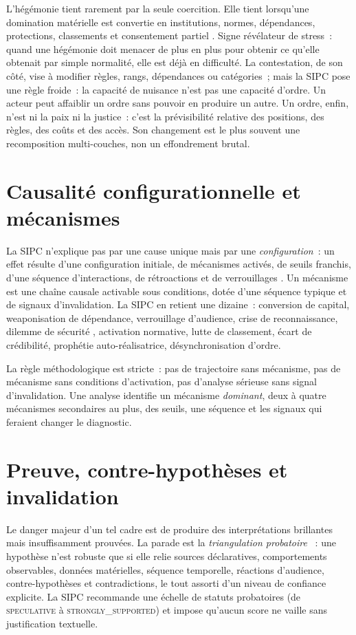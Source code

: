 \documentclass[11pt,a4paper]{article}
\begin{document}
L'hégémonie tient rarement par la seule coercition. Elle tient lorsqu'une domination matérielle
est convertie en institutions, normes, dépendances, protections, classements et consentement
partiel \autocite{gramsci1971,gilpin1987}. Signe révélateur de stress~: quand une hégémonie doit
menacer de plus en plus pour obtenir ce qu'elle obtenait par simple normalité, elle est déjà en
difficulté. La contestation, de son côté, vise à modifier règles, rangs, dépendances ou
catégories~; mais la SIPC pose une règle froide~: la capacité de nuisance n'est pas une capacité
d'ordre. Un acteur peut affaiblir un ordre sans pouvoir en produire un autre. Un ordre, enfin,
n'est ni la paix ni la justice~: c'est la prévisibilité relative des positions, des règles, des
coûts et des accès. Son changement est le plus souvent une recomposition multi-couches, non un
effondrement brutal.

\section{Causalité configurationnelle et mécanismes}
\label{sec:causalite}

La SIPC n'explique pas par une cause unique mais par une \emph{configuration}~: un effet résulte
d'une configuration initiale, de mécanismes activés, de seuils franchis, d'une séquence
d'interactions, de rétroactions et de verrouillages \autocite{hedstromSwedberg1998,elster1989}.
Un mécanisme est une chaîne causale activable sous conditions, dotée d'une séquence typique et
de signaux d'invalidation. La SIPC en retient une dizaine~: conversion de capital, weaponisation
de dépendance, verrouillage d'audience, crise de reconnaissance, dilemme de sécurité
\autocite{jervis1976}, activation normative, lutte de classement, écart de crédibilité,
prophétie auto-réalisatrice, désynchronisation d'ordre.

La règle méthodologique est stricte~: pas de trajectoire sans mécanisme, pas de mécanisme sans
conditions d'activation, pas d'analyse sérieuse sans signal d'invalidation. Une analyse
identifie un mécanisme \emph{dominant}, deux à quatre mécanismes secondaires au plus, des seuils,
une séquence et les signaux qui feraient changer le diagnostic.

\section{Preuve, contre-hypothèses et invalidation}
\label{sec:preuve}

Le danger majeur d'un tel cadre est de produire des interprétations brillantes mais
insuffisamment prouvées. La parade est la \emph{triangulation probatoire}
\autocite{beachPedersen2013}~: une hypothèse n'est robuste que si elle relie sources
déclaratives, comportements observables, données matérielles, séquence temporelle, réactions
d'audience, contre-hypothèses et contradictions, le tout assorti d'un niveau de confiance
explicite. La SIPC recommande une échelle de statuts probatoires (de \textsc{speculative} à
\textsc{strongly\_supported}) et impose qu'aucun score ne vaille sans justification textuelle.
\end{document}
